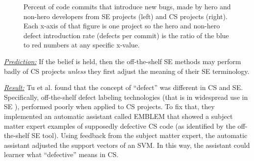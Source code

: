 \documentclass[sigconf,review,anonymous]{acmart}
\begin{document}
\begin{figure}[!t]

\caption{Percent of code commits that introduce new bugs, made by hero and non-hero developers from  SE projects (left) and CS projects (right).
Each x-axis of that figure is one project so the hero and non-hero defect introduction rate (defects per commit) is the ratio of the blue to red numbers
at any specific x-value.
}\label{fig:heroes}
\end{figure}




\noindent \textit{\underline{Prediction:}} If the belief is held, then the off-the-shelf SE methods may perform badly of CS projects {\em unless} they first adjust the meaning of their SE terminology.

\noindent \textit{\underline{Result:}} Tu et al. \cite{tu2019better} found that the concept of ``defect'' was  different in CS and SE.
Specifically, off-the-shelf defect labeling technologies (that is in widespread use in SE \cite{tu2019better,mockus00changeskeys}),
performed poorly when applied to CS projects.
To fix that, they implemented an automatic assistant called EMBLEM that showed a subject matter expert 
examples of supposedly defective CS code (as identified by the off-the-shelf SE tool).
Using feedback from the subject matter expert, the automatic assistant adjusted the support vectors of an SVM. In this way, the assistant could learner what ``defective'' means in CS.
\end{document}
